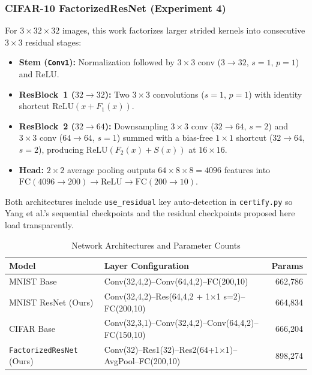 \documentclass[conference]{IEEEtran}
\begin{document}
\subsubsection{CIFAR-10 FactorizedResNet (Experiment 4)}
For $3{\times}32{\times}32$ images, this work factorizes larger strided
kernels into consecutive $3{\times}3$ residual stages:
\vspace{-3pt}
\begin{itemize}\setlength{\itemsep}{1pt}\setlength{\parskip}{0pt}
  \item \textbf{Stem (\texttt{Conv1}):} Normalization followed by $3{\times}3$
        conv ($3{\to}32$, $s{=}1$, $p{=}1$) and ReLU.
  \item \textbf{ResBlock~1 ($32{\to}32$):} Two $3{\times}3$ convolutions
        ($s{=}1$, $p{=}1$) with identity shortcut
        $\mathrm{ReLU}(x + F_1(x))$.
  \item \textbf{ResBlock~2 ($32{\to}64$):} Downsampling $3{\times}3$ conv
        ($32{\to}64$, $s{=}2$) and $3{\times}3$ conv ($64{\to}64$, $s{=}1$)
        summed with a bias-free $1{\times}1$ shortcut ($32{\to}64$, $s{=}2$),
        producing $\mathrm{ReLU}(F_2(x) + S(x))$ at $16{\times}16$.
  \item \textbf{Head:} $2{\times}2$ average pooling outputs $64{\times}8{\times}8
        = 4096$ features into
        $\mathrm{FC}(4096{\to}200) \to \mathrm{ReLU} \to \mathrm{FC}(200{\to}10)$.
\end{itemize}
\vspace{-2pt}
Both architectures include \texttt{use\_residual} key auto-detection in
\texttt{certify.py} so Yang et al.'s sequential checkpoints and the
residual checkpoints proposed here load transparently.

\begin{table}[t]
\caption{Network Architectures and Parameter Counts}
\centering
\footnotesize
\setlength{\tabcolsep}{1.8pt}
\renewcommand{\arraystretch}{1.02}
\begin{tabular}{|l|>{\raggedright\arraybackslash}p{3.95cm}|r|}
\hline
\textbf{Model} & \textbf{Layer Configuration} & \textbf{Params} \\
\hline
MNIST Base~\cite{b3} &
  Conv(32,4,2)--Conv(64,4,2)--FC(200,10) & 662,786 \\
\hline
MNIST ResNet (Ours) &
  Conv(32,4,2)--Res(64,4,2 + 1$\times$1 s=2)--FC(200,10) & 664,834 \\
\hline
CIFAR Base~\cite{b3} &
  Conv(32,3,1)--Conv(32,4,2)--Conv(64,4,2)--FC(150,10) & 666,204 \\
\hline
\texttt{FactorizedResNet} (Ours) &
  Conv(32)--Res1(32)--Res2(64+1$\times$1)--AvgPool--FC(200,10) & 898,274 \\
\hline
\end{tabular}
\label{tab:architectures}
\end{table}
\end{document}
